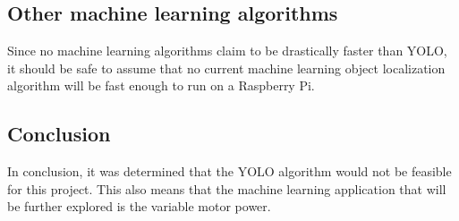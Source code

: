 \subsection{Other machine learning algorithms}
Since no machine learning algorithms claim to be drastically faster than YOLO, it should be safe to assume that no current machine learning object localization algorithm will be fast enough to run on a Raspberry Pi.

\subsection{Conclusion}
In conclusion, it was determined that the YOLO algorithm would not be feasible for this project.
This also means that the machine learning application that will be further explored is the variable motor power.